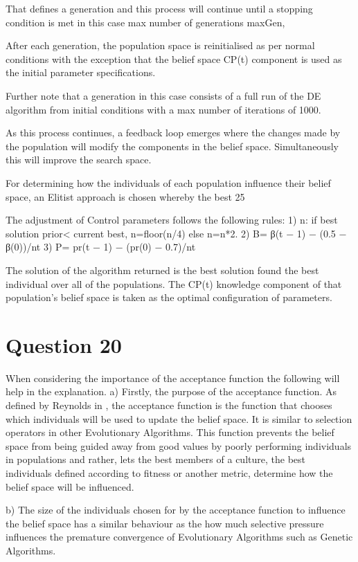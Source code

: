 \documentclass[12pt]{article}
\begin{document}
That defines a generation and this process will continue until a stopping condition is met in this case max number of generations maxGen,

After each generation, the population space is reinitialised as per normal conditions with the exception that the belief space CP(t) component is used as the initial parameter specifications.

Further note that a generation in this case consists of a full run of the DE algorithm from initial conditions with a max number of iterations of 1000.

As this process continues, a feedback loop emerges where the changes made by the population will modify the components in the belief space. Simultaneously this will improve the search space.

For determining how the individuals of each population influence their belief space, an Elitist approach is chosen whereby the best 25%

The adjustment of Control parameters follows the following rules:
	1) n: if best solution prior< current best, n=floor(n/4) else n=n*2.
	2) B= β(t − 1) − (0.5 − β(0))/nt \cite{chang_xu_2000}
	3) P= pr(t − 1) − (pr(0) − 0.7)/nt \cite{chang_xu_2000}

The solution of the algorithm returned is the best solution found the best individual over all of the populations. The CP(t) knowledge component of that population's belief space is taken as the optimal configuration of parameters.
\section{Question 20}
When considering the importance of the acceptance function the following will help in the explanation.
	a) Firstly, the purpose of the acceptance function.
	As defined by Reynolds in \cite{reynolds:1994:ica}, the acceptance function is the function that chooses which individuals will be used to update the belief space. It is similar to selection operators in other Evolutionary Algorithms. This function prevents the belief space from being guided away from good values by poorly performing individuals in populations and rather, lets the best members of a culture, the best individuals defined according to fitness or another metric, determine how the belief space will be influenced.

	b) The size of the individuals chosen for by the acceptance function to influence the belief space has a similar behaviour as the how much selective pressure influences the premature convergence of Evolutionary Algorithms such as Genetic Algorithms.
\end{document}
